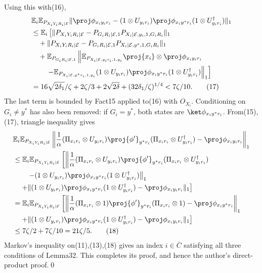 Using this with(16),
\begin{align*}&\mathbb E_i\mathbb E_{P_{X_iY_iR_i|\mathcal E}}\|\proj\phi_{x_iy_ir_i}-(1\otimes U_{y_ir_i})\proj\phi_{x_iy^*r_i}(1\otimes U_{y_ir_i}^\dagger)\|_1\\&\le\mathbb E_i\left[\|P_{X_iY_iR_i|\mathcal E}-P_{G_iR_i|\mathcal E,1}P_{X_i|\mathcal E,y_i,1,G_iR_i}\|_1\right.\\&\quad+\|P_{X_iY_iR_i|\mathcal E}-P_{G_iR_i|\mathcal E,1}P_{X_i|\mathcal E,y^*,1,G_iR_i}\|_1\\&\quad+\mathbb E_{P_{G_iR_i|\mathcal E,1}}\left\|\mathbb E_{P_{X_i|\mathcal E,y_ir_i,1,y_i}}\proj{x_i}\otimes\proj\phi_{x_iy_ir_i}\right.\\&\qquad\left.\left.-\mathbb E_{P_{X_i|\mathcal E,y^*r_i,1,y_i}}(1\otimes U_{y_ir_i})\proj\phi_{x_iy^*r_i}(1\otimes U_{y_ir_i}^\dagger)\right\|_1\right]\\&=16\sqrt{2\delta_1}/\zeta+2\zeta/3+2\sqrt{2\delta}+(32\delta_1/\zeta)^{1/4}<7\zeta/10.\tag{17}\end{align*}
The last term is bounded by Fact15 applied to(16) with $O_{X_i}$. Conditioning on $G_i\ne y^*$ has also been removed: if $G_i=y^*$, both states are $\ket\phi_{x_iy^*r_i}$.
From(15),(17), triangle inequality gives
\begin{align*}&\mathbb E_i\mathbb E_{P_{X_iY_iR_i|\mathcal E}}\left\|\frac1\alpha(\Pi_{x_ir_i}\otimes U_{y_ir_i})\proj{\phi'}_{y^*r_i}(\Pi_{x_ir_i}\otimes U_{y_ir_i}^\dagger)-\proj\phi_{x_iy_ir_i}\right\|_1\\&\le\mathbb E_i\mathbb E_{P_{X_iY_iR_i|\mathcal E}}\left[\left\|\frac1\alpha(\Pi_{x_ir_i}\otimes U_{y_ir_i})\proj{\phi'}_{y^*r_i}(\Pi_{x_ir_i}\otimes U_{y_ir_i}^\dagger)\right.\right.\\&\qquad\left.-(1\otimes U_{y_ir_i})\proj\phi_{x_iy^*r_i}(1\otimes U_{y_ir_i}^\dagger)\right\|_1\\&\quad\left.+\|(1\otimes U_{y_ir_i})\proj\phi_{x_iy^*r_i}(1\otimes U_{y_ir_i}^\dagger)-\proj\phi_{x_iy_ir_i}\|_1\right]\\&=\mathbb E_i\mathbb E_{P_{X_iY_iR_i|\mathcal E}}\left[\left\|\frac1\alpha(\Pi_{x_ir_i}\otimes1)\proj{\phi'}_{y^*r_i}(\Pi_{x_ir_i}\otimes1)-\proj\phi_{x_iy^*r_i}\right\|_1\right.\\&\quad\left.+\|(1\otimes U_{y_ir_i})\proj\phi_{x_iy^*r_i}(1\otimes U_{y_ir_i}^\dagger)-\proj\phi_{x_iy_ir_i}\|_1\right]\\&\le7\zeta/2+7\zeta/10=21\zeta/5.\tag{18}\end{align*}
Markov's inequality on(11),(13),(18) gives an index $i\in\overline C$ satisfying all three conditions of Lemma32. This completes its proof, and hence the author's direct-product proof.\qed
